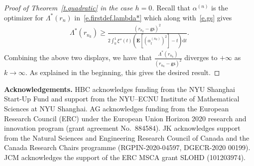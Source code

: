 \documentclass[11pt]{amsart}
\theoremstyle{remark}
\theoremstyle{definition}
\numberwithin{equation}{section}
\numberwithin{proposition}{section}
\numberwithin{figure}{section}
\numberwithin{table}{section}
\newcommand{\EE}{\mathbf{E}}
\renewcommand{\geq}{\geqslant}
\newcommand{\Ll}{\left}
\newcommand{\Rr}{\right}
\renewcommand{\d}{\mathrm{d}}
\newcommand{\1}{\mathbf{1}}
\newcommand{\msf}{\mathsf}
\newcommand{\pnp}{{(n)}}
\newcommand{\gs}{\msf {gs}}
\begin{document}
\begin{proof}[Proof of Theorem~\ref{t.quadratic} in the case $h=0$]
Recall that $\alpha^\pnp$ is the optimizer for $\Lambda^*(r_n)$ in~\eqref{e.firstdef.lambda*} which along with~\eqref{e.gs} gives
\begin{align*}
    \Lambda^*\Ll(r_{n_k}\Rr) \geq \frac{(r_{n_k}-\gs)^2}{2\int_0^1\xi''(t)\Ll(\EE\Ll[\Ll(\alpha^{(n_k)}_t\Rr)^2\Rr]-t\Rr)\d t}.
\end{align*}
Combining the above two displays, we have that $\frac{\Lambda^*\Ll(r_{n_k}\Rr)}{(r_{n_k}-\gs)^2}$ diverges to $+\infty$ as $k\to\infty$. As explained in the beginning, this gives the desired result.
\end{proof}

\medskip

\noindent \textbf{Acknowledgements.} HBC acknowledges funding from the NYU Shanghai Start-Up Fund and support from the NYU–ECNU Institute of Mathematical Sciences at NYU Shanghai. AG acknowledges funding from the European Research Council (ERC) under the European Union
Horizon 2020 research and innovation program (grant agreement No.\ 884584). JK acknowledges support from the Natural Sciences and Engineering Research Council of Canada and the Canada Research
Chairs programme (RGPIN-2020-04597, DGECR-2020 00199). JCM acknowledges the support of the ERC MSCA grant SLOHD (101203974). 


\small


\end{document}
